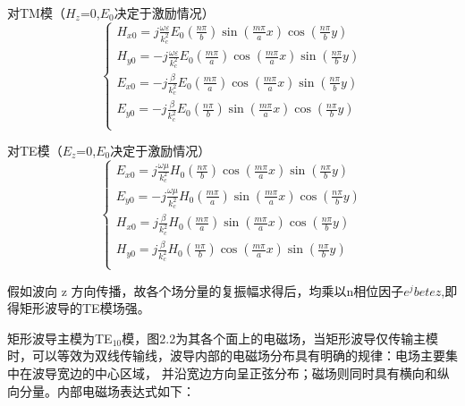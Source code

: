     对TM模（$H_z$=0,$E_0$决定于激励情况）
\begin{equation}
    \begin{cases}
        H_{x0}=j\frac{\omega \varepsilon}{k_c^2}E_0
            \left(\frac{n\pi}{b}\right)
            \sin\left(\frac{m\pi}{a}x\right)
            \cos\left(\frac{n\pi}{b}y\right)\\
        H_{y0}=-j\frac{\omega \varepsilon}{k_c^2}E_0
            \left(\frac{m\pi}{a}\right)
            \cos\left(\frac{m\pi}{a}x\right)
            \sin\left(\frac{n\pi}{b}y\right)\\
        E_{x0}=-j\frac{\beta}{k_c^2}E_0
            \left(\frac{m\pi}{a}\right) 
            \cos\left(\frac{m\pi}{a}x\right)
            \sin\left(\frac{n\pi}{b}y\right)\\
        E_{y0}=-j\frac{\beta}{k_c^2}E_0
            \left(\frac{n\pi}{b}\right)
            \sin\left(\frac{m\pi}{a}x\right)
            \cos\left(\frac{n\pi}{b}y\right)\\
    \end{cases}
\end{equation}

    对TE模（$E_z$=0,$E_0$决定于激励情况）
\begin{equation}
    \begin{cases}
        E_{x0}=j\frac{\omega \mu}{k_c^2}H_0
            \left(\frac{n\pi}{b}\right)
            \cos\left(\frac{m\pi}{a}x\right)
            \sin\left(\frac{n\pi}{b}y\right)\\
        E_{y0}=-j\frac{\omega \mu}{k_c^2}H_0
            \left(\frac{m\pi}{a}\right)
            \sin\left(\frac{m\pi}{a}x\right)
            \cos\left(\frac{n\pi}{b}y\right)\\
        H_{x0}=j\frac{\beta}{k_c^2}H_0
            \left(\frac{m\pi}{a}\right)
            \sin\left(\frac{m\pi}{a}x\right)
            \cos\left(\frac{n\pi}{b}y\right)\\
        H_{y0}=j\frac{\beta}{k_c^2}H_0
            \left(\frac{n\pi}{b}\right)
            \cos\left(\frac{m\pi}{a}x\right)
            \sin\left(\frac{n\pi}{b}y\right)\\
    \end{cases}
\end{equation}

    假如波向 z 方向传播，故各个场分量的复振幅求得后，均乘以n相位因子$e^j{bete}z$,即得矩形波导的TE模场强。

    矩形波导主模为TE$_{10}$模，图2.2为其各个面上的电磁场，当矩形波导仅传输主模时，可以等效为双线传输线，波导内部的电磁场分布具有明确的规律：电场主要集中在波导宽边的中心区域，
并沿宽边方向呈正弦分布；磁场则同时具有横向和纵向分量。内部电磁场表达式如下：

